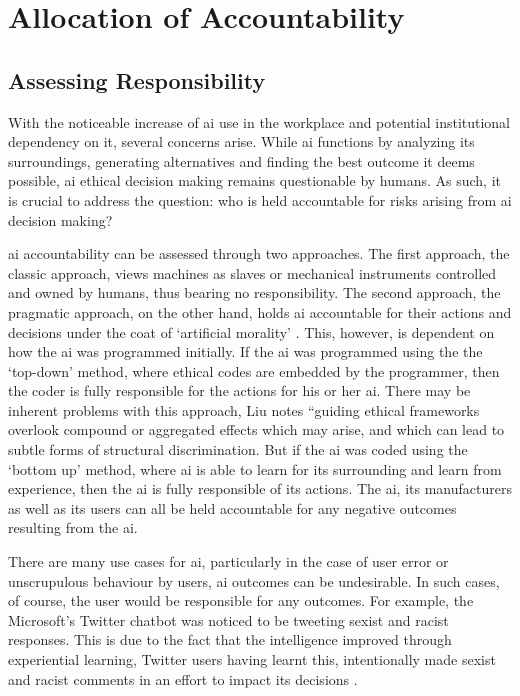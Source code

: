 \documentclass[11pt]{article}
\begin{document}
\section{Allocation of Accountability}
\label{sec:org31c733a}
\subsection{Assessing Responsibility}
\label{sec:orgd858497}
With the noticeable increase of \gls{ai} use in the workplace and potential institutional dependency on it, several concerns arise. 
While \gls{ai} functions by analyzing its surroundings, generating alternatives and finding the best outcome it deems possible, \gls{ai} ethical decision making remains questionable by humans. 
As such, it is crucial to address the question: who is held accountable for risks arising from \gls{ai} decision making? 

\gls{ai} accountability can be assessed through two approaches. 
The first approach, the classic approach, views machines as slaves or mechanical instruments controlled and owned by humans, thus bearing no responsibility. 
The second approach, the pragmatic approach, on the other hand, holds \gls{ai} accountable for their actions and decisions under the coat of `artificial morality' \citep{alaieri2016}.
This, however, is dependent on how the \gls{ai} was programmed initially. 
If the \gls{ai} was programmed using the the `top-down' method, where ethical codes are embedded by the programmer, then the coder is fully responsible for the actions for his or her \gls{ai}. 
There may be inherent problems with this approach, Liu notes ``guiding ethical frameworks overlook compound or aggregated effects which may arise, and which can lead to subtle forms of structural discrimination\citep[p.1]{liu2017}.
But if the \gls{ai} was coded using the `bottom up' method, where \gls{ai} is able to learn for its surrounding and learn from experience, then the \gls{ai} is fully responsible of its actions. 
The \gls{ai}, its manufacturers as well as its users can all be held accountable for any negative outcomes resulting from the \gls{ai}. 

There are many use cases for \gls{ai}, particularly in the case of user error or unscrupulous behaviour by users, \gls{ai} outcomes can be undesirable. 
In such cases, of course, the user would be responsible for any outcomes. 
For example, the Microsoft's Twitter chatbot was noticed to be tweeting sexist and racist responses. 
This is due to the fact that the intelligence improved through experiential learning, Twitter users having learnt this, intentionally made sexist and racist comments in an effort to impact its decisions \citep{alaieri2016}.
\end{document}
